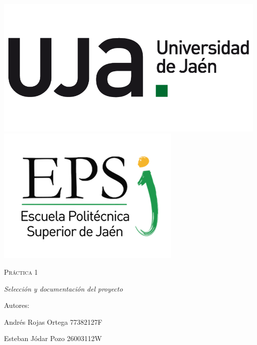 	\begin{titlepage}
		\centering
		{\includegraphics[scale=0.2]{img/np_UJA_generica_6.png}
		\includegraphics[scale=0.35]{img/Logo_EPS.png}}
		\vspace{1cm}
		{\scshape\Huge Práctica 1 \par}
		\vspace{3cm}
		{\itshape\Large Selección y documentación del proyecto \par}
		\vfill
		{\Large Autores: \par}
		{\Large Andrés Rojas Ortega 77382127F\par}
		{\Large Esteban Jódar Pozo 26003112W\par}
		\vfill
	\end{titlepage}

	\paragraph{}
	\paragraph{}
	
	\tableofcontents
	
	\newpage
